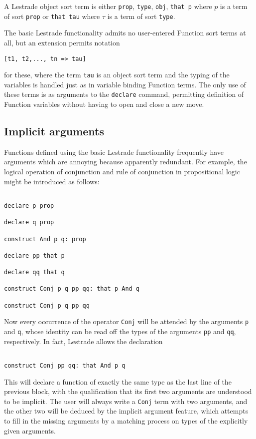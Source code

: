 \documentclass[12pt]{article}
\begin{document}
A Lestrade object sort term is either {\tt prop}, {\tt type}, {\tt obj}, {\tt that p} where $p$ is a term of sort {\tt prop} or {\tt that tau} where $\tau$ is a term of sort {\tt type}.

The basic Lestrade functionality admits no user-entered Function sort terms at all, but an extension permits notation \begin{center}{\tt [t1, t2,..., tn => tau]}\end{center} for these, where the term {\tt tau} is an object sort term and the typing of the variables is handled just as in variable binding Function terms.  The only use of these terms is as arguments to the {\tt declare} command, permitting definition of Function variables without having to open and close a new move.

\subsection{Implicit arguments}

Functions defined using the basic Lestrade functionality frequently have arguments which are annoying because apparently redundant.  For example, the logical operation of conjunction and rule of conjunction
in propositional logic might be introduced as follows:

\begin{verbatim}

declare p prop

declare q prop

construct And p q: prop

declare pp that p

declare qq that q

construct Conj p q pp qq: that p And q

construct Conj p q pp qq

\end{verbatim}

Now every occurrence of the operator {\tt Conj} will be attended by the arguments {\tt p} and {\tt q}, whose identity can be read off the types of the arguments {\tt pp} and
{\tt qq}, respectively.  In fact, Lestrade allows the declaration

\begin{verbatim}

construct Conj pp qq: that And p q

\end{verbatim}

This will declare a function of exactly the same type as the last line of the previous block, with the qualification that its first two arguments are understood to be implicit.  The user will always write a {\tt Conj} term with two arguments, and the other two will be deduced by the implicit argument feature, which attempts to fill in the missing arguments by a matching process on types of the explicitly given arguments.
\end{document}
